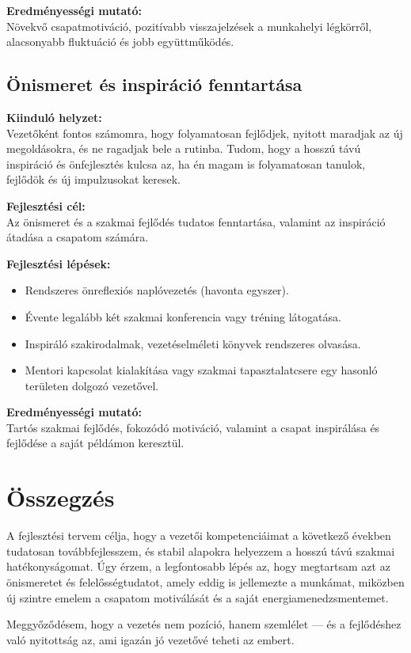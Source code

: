 \textbf{Eredményességi mutató:} \\
Növekvő csapatmotiváció, pozitívabb visszajelzések a munkahelyi légkörről, alacsonyabb fluktuáció és jobb együttműködés.

\subsection{Önismeret és inspiráció fenntartása}

\textbf{Kiinduló helyzet:} \\
Vezetőként fontos számomra, hogy folyamatosan fejlődjek, nyitott maradjak az új megoldásokra, és ne ragadjak bele a rutinba.
Tudom, hogy a hosszú távú inspiráció és önfejlesztés kulcsa az, ha én magam is folyamatosan tanulok, fejlődök és új impulzusokat keresek.

\textbf{Fejlesztési cél:} \\
Az önismeret és a szakmai fejlődés tudatos fenntartása, valamint az inspiráció átadása a csapatom számára.

\textbf{Fejlesztési lépések:}
\begin{itemize}
    \item Rendszeres önreflexiós naplóvezetés (havonta egyszer).
    \item Évente legalább két szakmai konferencia vagy tréning látogatása.
    \item Inspiráló szakirodalmak, vezetéselméleti könyvek rendszeres olvasása.
    \item Mentori kapcsolat kialakítása vagy szakmai tapasztalatcsere egy hasonló területen dolgozó vezetővel.
\end{itemize}

\textbf{Eredményességi mutató:} \\
Tartós szakmai fejlődés, fokozódó motiváció, valamint a csapat inspirálása és fejlődése a saját példámon keresztül.

\section{Összegzés}

A fejlesztési tervem célja, hogy a vezetői kompetenciáimat a következő években tudatosan továbbfejlesszem, és stabil alapokra helyezzem a hosszú távú szakmai hatékonyságomat.
Úgy érzem, a legfontosabb lépés az, hogy megtartsam azt az önismeretet és felelősségtudatot, amely eddig is jellemezte a munkámat, miközben új szintre emelem a csapatom motiválását és a saját energiamenedzsmentemet.

Meggyőződésem, hogy a vezetés nem pozíció, hanem szemlélet — és a fejlődéshez való nyitottság az, ami igazán jó vezetővé teheti az embert.
